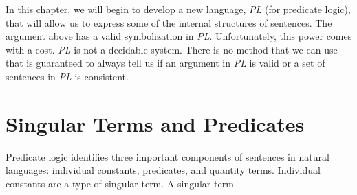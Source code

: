 \documentclass[../logic-text.tex]{subfiles}
\begin{document}
In this chapter, we will begin to develop a new language, \emph{PL} (for predicate logic), that will allow us to express some of the internal structures of sentences. The argument above has a valid symbolization in \emph{PL}. Unfortunately, this power comes with a cost. \emph{PL} is not a decidable system. There is no method that we can use that is guaranteed to always tell us if an argument in \emph{PL} is valid or a set of sentences in \emph{PL} is consistent.


\section{Singular Terms and Predicates}
\label{sec:sing-terms-pred}

Predicate logic identifies three important components of sentences in natural languages: individual constants, predicates, and quantity terms. Individual constants are a type of singular term. A singular term
\end{document}
